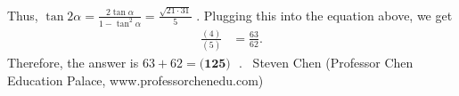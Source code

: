 \documentclass[12pt]{article}
\begin{document}
Thus, $\tan 2 \alpha = \frac{2 \tan \alpha}{1 - \tan^2 \alpha} = \frac{\sqrt{21 \cdot 31}}{5}$ .
Plugging this into the equation above, we get \begin{align*} \frac{(4)}{(5)} & = \frac{63}{62}. \end{align*} Therefore, the answer is $63 + 62 = \boxed{\textbf{(125) }}$ . ~Steven Chen (Professor Chen Education Palace, www.professorchenedu.com)
\end{document}
